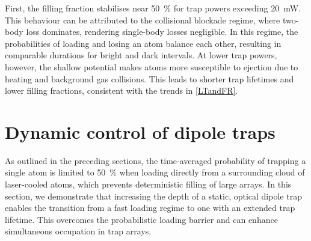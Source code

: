 \documentclass[../Thesis-IJspeert.tex]{subfiles}
\begin{document}
First, the filling fraction stabilises near \SI{50}{\percent} for trap powers exceeding \SI{20}{\milli\watt}. This behaviour can be attributed to the collisional blockade regime, where two-body loss dominates, rendering single-body losses negligible. In this regime, the probabilities of loading and losing an atom balance each other, resulting in comparable durations for bright and dark intervals. At lower trap powers, however, the shallow potential makes atoms more susceptible to ejection due to heating and background gas collisions. This leads to shorter trap lifetimes and lower filling fractions, consistent with the trends in \autoref{LTandFR}.

\section{Dynamic control of dipole traps}
\label{dynamiccontrol}
As outlined in the preceding sections, the time-averaged probability of trapping a single atom is limited to \SI{50}{\percent} when loading directly from a surrounding cloud of laser-cooled atoms, which prevents deterministic filling of large arrays. In this section, we demonstrate that increasing the depth of a static, optical dipole trap enables the transition from a fast loading regime to one with an extended trap lifetime. This overcomes the probabilistic loading barrier and can enhance simultaneous occupation in trap arrays.
\end{document}
